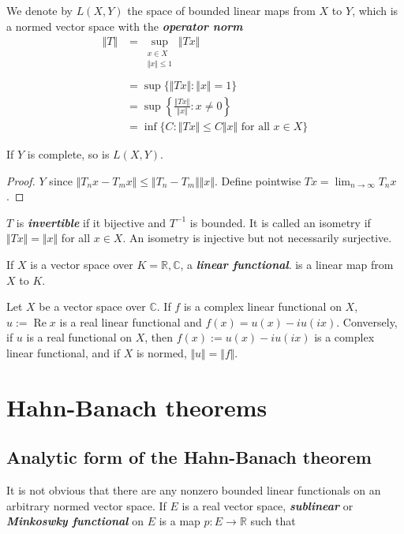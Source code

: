 \documentclass{article}
\theoremstyle{definition}
\numberwithin{equation}{section}
\newcommand{\R}{\mathbb{R}}
\newcommand{\C}{\mathbb{C}}
\begin{document}
We denote by $L(X,Y)$ the space of bounded linear maps from $X$ to $Y$, which is a normed vector space with the \textbf{\textit{operator norm}}
\begin{align*}
	\Vert T\Vert&=\sup_{\substack{x\in X\\\Vert x\Vert\leq1}}\Vert Tx\Vert\\\\
	&=\sup\{\Vert Tx\Vert:\Vert x\Vert=1\}\\
	&=\sup\left\{\frac{\Vert Tx\Vert}{\Vert x\Vert}:x\neq0\right\}\\
	&=\inf\{C:\Vert Tx\Vert\leq C\Vert x\Vert \text{ for all }x\in X\}
\end{align*}
\begin{prop}
	If $Y$ is complete, so is $L(X,Y)$.
\end{prop}
\begin{proof}
$Y$ since $\Vert T_nx-T_mx\Vert\leq\Vert T_n-T_m\Vert\Vert x\Vert$. Define pointwise $Tx=\lim_{n\to\infty}T_nx$.
\end{proof}
$T$ is \textbf{\textit{invertible}} if it bijective and $T^{-1}$ is bounded. It is called an isometry if $\Vert Tx\Vert=\Vert x\Vert$ for all $x\in X$. An isometry is injective but not necessarily surjective.

If $X$ is a vector space over $K=\R,\C$, a \textbf{\textit{linear functional}}. is a linear map from $X$ to $K$.

\begin{prop}
	Let $X$ be a vector space over $\C$. If $f$ is a complex linear functional on $X$,
	$u:=\operatorname{Re}x$ is a real linear functional and $f(x)=u(x)-iu(ix)$.
	Conversely, if $u$ is a real functional on $X$, then $f(x):=u(x)-iu(ix)$ is a complex linear functional, and if $X$ is normed, $\Vert u\Vert=\Vert f\Vert$.
\end{prop}

\section{Hahn-Banach theorems}
	\subsection{Analytic form of the Hahn-Banach theorem}
It is not obvious that there are any nonzero bounded linear functionals on an arbitrary normed vector space. If $E$ is a real vector space, \textbf{\textit{sublinear}} or \textbf{\textit{Minkoswky functional}} on $E$ is a map $p:E\to\R$ such that
\end{document}
